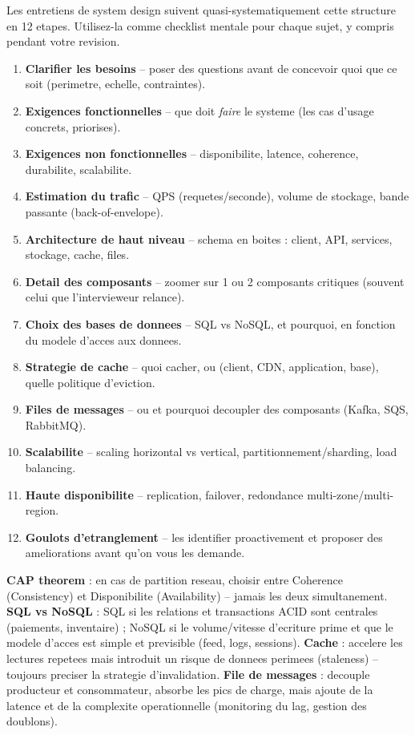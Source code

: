 \documentclass[11pt,a4paper]{article}
\begin{document}
Les entretiens de system design suivent quasi-systematiquement cette structure en 12 etapes. Utilisez-la comme checklist mentale pour chaque sujet, y compris pendant votre revision.

\begin{enumerate}[leftmargin=1.3cm, itemsep=2pt]
  \item \textbf{Clarifier les besoins} -- poser des questions avant de concevoir quoi que ce soit (perimetre, echelle, contraintes).
  \item \textbf{Exigences fonctionnelles} -- que doit \emph{faire} le systeme (les cas d'usage concrets, priorises).
  \item \textbf{Exigences non fonctionnelles} -- disponibilite, latence, coherence, durabilite, scalabilite.
  \item \textbf{Estimation du trafic} -- QPS (requetes/seconde), volume de stockage, bande passante (back-of-envelope).
  \item \textbf{Architecture de haut niveau} -- schema en boites : client, API, services, stockage, cache, files.
  \item \textbf{Detail des composants} -- zoomer sur 1 ou 2 composants critiques (souvent celui que l'intervieweur relance).
  \item \textbf{Choix des bases de donnees} -- SQL vs NoSQL, et pourquoi, en fonction du modele d'acces aux donnees.
  \item \textbf{Strategie de cache} -- quoi cacher, ou (client, CDN, application, base), quelle politique d'eviction.
  \item \textbf{Files de messages} -- ou et pourquoi decoupler des composants (Kafka, SQS, RabbitMQ).
  \item \textbf{Scalabilite} -- scaling horizontal vs vertical, partitionnement/sharding, load balancing.
  \item \textbf{Haute disponibilite} -- replication, failover, redondance multi-zone/multi-region.
  \item \textbf{Goulots d'etranglement} -- les identifier proactivement et proposer des ameliorations avant qu'on vous les demande.
\end{enumerate}

\begin{tradeoff}
\textbf{CAP theorem} : en cas de partition reseau, choisir entre Coherence (Consistency) et Disponibilite (Availability) -- jamais les deux simultanement. \textbf{SQL vs NoSQL} : SQL si les relations et transactions ACID sont centrales (paiements, inventaire) ; NoSQL si le volume/vitesse d'ecriture prime et que le modele d'acces est simple et previsible (feed, logs, sessions). \textbf{Cache} : accelere les lectures repetees mais introduit un risque de donnees perimees (staleness) -- toujours preciser la strategie d'invalidation. \textbf{File de messages} : decouple producteur et consommateur, absorbe les pics de charge, mais ajoute de la latence et de la complexite operationnelle (monitoring du lag, gestion des doublons).
\end{tradeoff}
\end{document}
